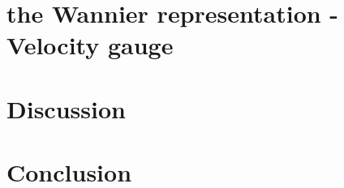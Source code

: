 \documentclass[aps,prb,preprint]{revtex4-1}
\begin{document}
\section{the Wannier representation -Velocity gauge }\cite{Iafrate} 
\label{sec:WV}


\section{Discussion}

\section{Conclusion}

\newpage
\end{document}
